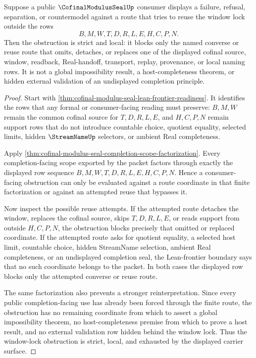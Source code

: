 \begin{corollary}
\label{cor:cofinal-modulus-seal-window-lock-strict-obstruction}
Suppose a public $\CofinalModulusSealUp$ consumer displays a failure, refusal, separation, or countermodel against a route that tries to reuse the window lock outside the rows
$$
B,M,W,T,D,R,L,E,H,C,P,N.
$$
Then the obstruction is strict and local: it blocks only the named converse or reuse route that omits, detaches, or replaces one of the displayed cofinal source, window, readback, Real-handoff, transport, replay, provenance, or local naming rows. It is not a global impossibility result, a host-completeness theorem, or hidden external validation of an undisplayed completion principle.
\end{corollary}
\begin{proof}
Start with \autoref{thm:cofinal-modulus-seal-lean-frontier-readiness}. It identifies the rows that any formal or consumer-facing reading must preserve: $B,M,W$ remain the common cofinal source for $T,D,R,L,E$, and $H,C,P,N$ remain support rows that do not introduce countable choice, quotient equality, selected limits, hidden $\StreamNameUp$ selectors, or ambient Real completeness.

Apply \autoref{thm:cofinal-modulus-seal-completion-scope-factorization}. Every completion-facing scope exported by the packet factors through exactly the displayed row sequence $B,M,W,T,D,R,L,E,H,C,P,N$. Hence a consumer-facing obstruction can only be evaluated against a route coordinate in that finite factorization or against an attempted reuse that bypasses it.

Now inspect the possible reuse attempts. If the attempted route detaches the window, replaces the cofinal source, skips $T,D,R,L,E$, or reads support from outside $H,C,P,N$, the obstruction blocks precisely that omitted or replaced coordinate. If the attempted route asks for quotient equality, a selected host limit, countable choice, hidden StreamName selection, ambient Real completeness, or an undisplayed completion seal, the Lean-frontier boundary says that no such coordinate belongs to the packet. In both cases the displayed row blocks only the attempted converse or reuse route.

The same factorization also prevents a stronger reinterpretation. Since every public completion-facing use has already been forced through the finite route, the obstruction has no remaining coordinate from which to assert a global impossibility theorem, no host-completeness premise from which to prove a host result, and no external validation row hidden behind the window lock. Thus the window-lock obstruction is strict, local, and exhausted by the displayed carrier surface.
\end{proof}
